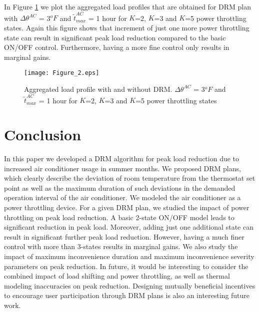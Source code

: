 \documentclass[10pt,twocolumn,twoside]{IEEEtran}
\begin{document}
In Figure \ref{fig:fig002} we plot the aggregated load profiles that are obtained for DRM plan with $\Delta{\theta}^{AC}$ = 3$^oF$ and $\tilde{t}^{AC}_{max}$ = 1 hour for $K$=2, $K$=3 and $K$=5 power throttling states. Again this figure shows that increment of just one more power throttling state can result in significant peak load reduction compared to the basic ON/OFF control. Furthermore, having a more fine control only results in marginal gains.  

\begin{figure}[htb]
\centering
\texttt{[image: Figure\_2.eps]}
\caption{Aggregated load profile with and without DRM. $\Delta{\theta}^{AC}$ = 3$^oF$ and $\tilde{t}^{AC}_{max}$ = 1 hour for $K$=2, $K$=3 and $K$=5 power throttling states} 
\label{fig:fig002}
\end{figure}

\section{Conclusion}
In this paper we developed a DRM algorithm for peak load reduction due to increased air conditioner usage in summer months. We proposed DRM plans, which clearly describe the deviation of room temperature from the thermostat set point as well as the maximum duration of such deviations in the demanded operation interval of the air conditioner. We modeled the air conditioner as a power throttling device. For a given DRM plan, we studied the impact of power throttling on peak load reduction. A basic 2-state ON/OFF model leads to significant reduction in peak load. Moreover, adding just one additional state can result in significant further peak load reduction. However, having a much finer control with more than 3-states results in marginal gains. We also study the impact of maximum inconvenience duration and maximum inconvenience severity parameters on peak reduction. In future, it would be interesting to consider the combined impact of load shifting and power throttling, as well as thermal modeling inaccuracies on peak reduction. Designing mutually beneficial incentives to encourage user participation through DRM plans is also an interesting future work.  
\end{document}
